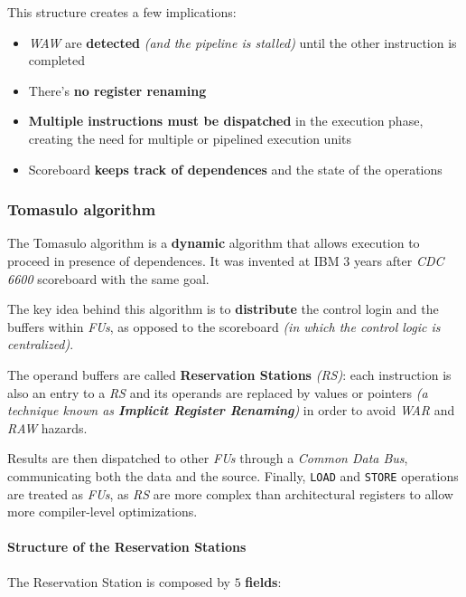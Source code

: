 \documentclass[english]{article}
\begin{document}
\bigskip
This structure creates a few implications:

\begin{itemize}
  \item \textit{WAW} are \textbf{detected} \textit{(and the pipeline is stalled)} until the other instruction is completed
  \item There's \textbf{no register renaming}
  \item \textbf{Multiple instructions must be dispatched} in the execution phase, creating the need for multiple or pipelined execution units
  \item Scoreboard \textbf{keeps track of dependences} and the state of the operations
\end{itemize}

\subsubsection{Tomasulo algorithm}

The Tomasulo algorithm is a \textbf{dynamic} algorithm that allows execution to proceed in presence of dependences.
It was invented at IBM \(3\) years after \textit{CDC 6600} scoreboard with the same goal.

The key idea behind this algorithm is to \textbf{distribute} the control login and the buffers within \textit{FUs}, as opposed to the scoreboard \textit{(in which the control logic is centralized)}.

The operand buffers are called \textbf{Reservation Stations} \textit{(RS)}:
each instruction is also an entry to a \textit{RS} and its operands are replaced by values or pointers \textit{(a technique known as \textbf{Implicit Register Renaming})} in order to avoid \textit{WAR} and \textit{RAW} hazards.

Results are then dispatched to other \textit{FUs} through a \textit{Common Data Bus}, communicating both the data and the source.
Finally, \texttt{LOAD} and \texttt{STORE} operations are treated as \textit{FUs}, as \textit{RS} are more complex than architectural registers to allow more compiler-level optimizations.

\paragraph{Structure of the Reservation Stations}

The Reservation Station is composed by \(5\) \textbf{fields}:
\end{document}
